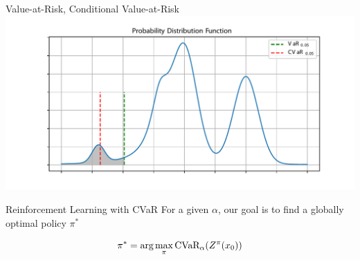 \documentclass{beamer}
\begin{document}
%


\begin{frame}{Value-at-Risk, Conditional Value-at-Risk}
\center
\includegraphics[width=0.8\linewidth]{../gfx/pdf.pdf}

\begin{block}{Reinforcement Learning with CVaR}
For a given $\alpha$, our goal is to find a globally optimal policy $\pi^*$

$$\pi^* = \text{arg}\max_\pi \text{CVaR}_\alpha(Z^\pi(x_0))$$
\end{block}

\end{frame}

\end{document}
